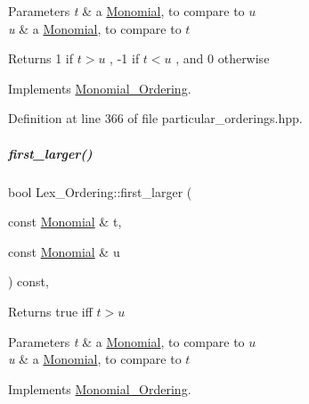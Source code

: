 \begin{DoxyParams}{Parameters}
{\em t} & a \hyperlink{group__polygroup_class_monomial}{Monomial}, to compare to $ u $ \\
\hline
{\em u} & a \hyperlink{group__polygroup_class_monomial}{Monomial}, to compare to $ t $ \\
\hline
\end{DoxyParams}
\begin{DoxyReturn}{Returns}
1 if $ t>u $ , -\/1 if $ t < u $ , and 0 otherwise 
\end{DoxyReturn}


Implements \hyperlink{group__orderinggroup_a9bc3155fc98b4d40c26118fa2114b827}{Monomial\+\_\+\+Ordering}.



Definition at line 366 of file particular\+\_\+orderings.\+hpp.

\mbox{\label{group__orderinggroup_acf085490051fdbbdde6e89831e3f0eda}} 
\subparagraph{\texorpdfstring{first\+\_\+larger()}{first\_larger()}}
{\footnotesize\ttfamily bool Lex\+\_\+\+Ordering\+::first\+\_\+larger (\begin{DoxyParamCaption}\item[{const \hyperlink{group__polygroup_class_monomial}{Monomial} \&}]{t,  }\item[{const \hyperlink{group__polygroup_class_monomial}{Monomial} \&}]{u }\end{DoxyParamCaption}) const\hspace{0.3cm}{\ttfamily [override]}, {\ttfamily [virtual]}}

\begin{DoxyReturn}{Returns}
{\ttfamily true} iff $t>u$ 
\end{DoxyReturn}

\begin{DoxyParams}{Parameters}
{\em t} & a \hyperlink{group__polygroup_class_monomial}{Monomial}, to compare to $ u $ \\
\hline
{\em u} & a \hyperlink{group__polygroup_class_monomial}{Monomial}, to compare to $ t $ \\
\hline
\end{DoxyParams}


Implements \hyperlink{group__orderinggroup_aed41fe82e1ca5cd287a93d287fee7c20}{Monomial\+\_\+\+Ordering}.




